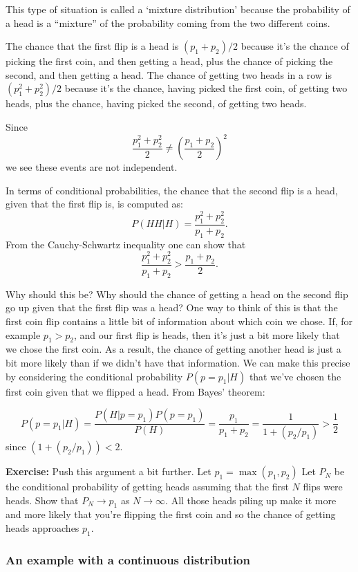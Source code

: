 \documentclass[
  11pt,
  letterpaper,
]{scrbook}
\theoremstyle{plain}
\theoremstyle{remark}
\begin{document}
This type of situation is called a `mixture distribution' because the
probability of a head is a ``mixture'' of the probability coming from
the two different coins.

The chance that the first flip is a head is \((p_1+p_2)/2\) because it's
the chance of picking the first coin, and then getting a head, plus the
chance of picking the second, and then getting a head. The chance of
getting two heads in a row is \((p_1^2+p_2^2)/2\) because it's the
chance, having picked the first coin, of getting two heads, plus the
chance, having picked the second, of getting two heads.

Since \[
\frac{p_1^2+p_2^2}{2}\not=\left(\frac{p_1+p_2}{2}\right)^2
\] we see these events are not independent.

In terms of conditional probabilities, the chance that the second flip
is a head, given that the first flip is, is computed as: \[
P(HH|H) = \frac{p_1^2+p_2^2}{p_1+p_2}.
\] From the Cauchy-Schwartz inequality one can show that \[
\frac{p_1^2+p_2^2}{p_1+p_2}>\frac{p_1+p_2}{2}.
\]

Why should this be? Why should the chance of getting a head on the
second flip go up given that the first flip was a head? One way to think
of this is that the first coin flip contains a little bit of information
about which coin we chose. If, for example \(p_1>p_2\), and our first
flip is heads, then it's just a bit more likely that we chose the first
coin. As a result, the chance of getting another head is just a bit more
likely than if we didn't have that information. We can make this precise
by considering the conditional probability \(P(p=p_1|H)\) that we've
chosen the first coin given that we flipped a head. From Bayes' theorem:

\[
P(p=p_1|H) = \frac{P(H|p=p_1)P(p=p_1)}{P(H)}=\frac{p_1}{p_1+p_2}=\frac{1}{1+(p_2/p_1)}>\frac{1}{2}
\] since \((1+(p_2/p_1))<2\).

\textbf{Exercise:} Push this argument a bit further. Let
\(p_1=\max(p_1,p_2)\) Let \(P_N\) be the conditional probability of
getting heads assuming that the first \(N\) flips were heads. Show that
\(P_N\to p_1\) as \(N\to\infty\). All those heads piling up make it more
and more likely that you're flipping the first coin and so the chance of
getting heads approaches \(p_1\).

\hypertarget{an-example-with-a-continuous-distribution}{%
\subsubsection{An example with a continuous
distribution}\label{an-example-with-a-continuous-distribution}}
\end{document}
